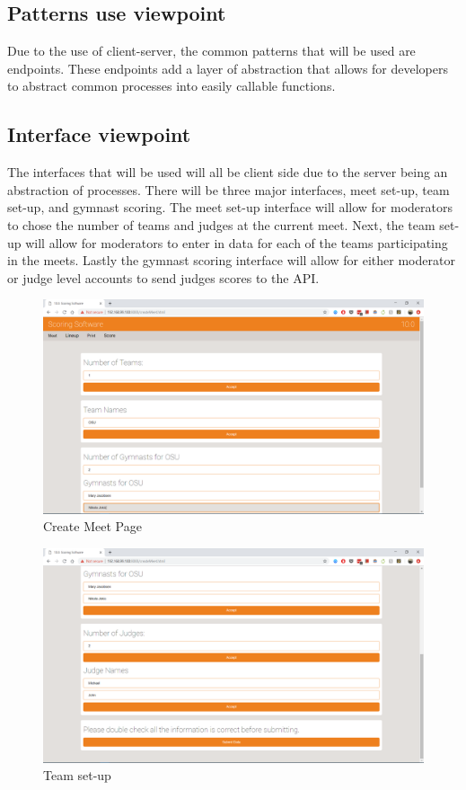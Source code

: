 \documentclass[letterpaper,10pt,draftclsnofoot,onecolumn,]{article}
\begin{document}
\subsection{Patterns use viewpoint}
Due to the use of client-server, the common patterns that will be used are endpoints. These endpoints add a layer of abstraction that allows for developers to abstract common processes into easily callable functions.
\subsection{Interface viewpoint}
The interfaces that will be used will all be client side due to the server being an abstraction of processes. There will be three major interfaces, meet set-up, team set-up, and gymnast scoring. The meet set-up interface will allow for moderators to chose the number of teams and judges at the current meet. Next, the team set-up will allow for moderators to enter in data for each of the teams participating in the meets. Lastly the gymnast scoring interface will allow for either moderator or judge level accounts to send judges scores to the API.
\begin{figure}[H]
  \includegraphics[width=\linewidth]{Capture.PNG}
  \caption{Create Meet Page}
  \label{fig:createMeet}
\end{figure}

\begin{figure}[H]
  \includegraphics[width=\linewidth]{Capture2.PNG}
  \caption{Team set-up}
  \label{fig:teamsetup}
\end{figure}
\end{document}
